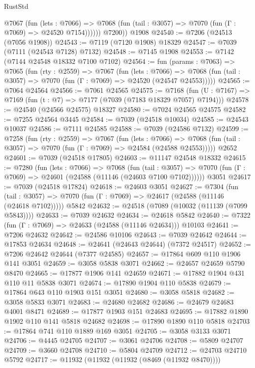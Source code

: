 \begin{lexlean}{RustStd}
\begin{coremodule}
            @7067
              (fun (lets : @7066) =>
              @7068 (fun (tail : @3057) => @7070 (fun (Γ : @7069) => @24520 @7154))))))
        @7200))
    @1908
@24540 := @7206 (@24513 (@7056 @1908))
@24543 := @7119 (@7120 @1908) @18329
@24547 := @7039 (@7111 (@24543 @7128) @7132)
@24548 := @7145 @1908
@24553 := @7142 (@7144 @24548 @18332 @7100 @7102)
@24564 := fun (params : @7063) =>
  @7065
    (fun (rty : @2559) =>
    @7067
      (fun (lets : @7066) =>
      @7068 (fun (tail : @3057) => @7070 (fun (Γ : @7069) => @24520 (@24547 @24553)))))
@24565 := @7064 @24564
@24566 := @7061 @24565
@24575 := @7168
    (fun (U : @7167) => @7169 (fun (t : @7) => @7177 (@7039 (@7183 @18329 @7057) @7194)))
@24578 := @24540 (@24566 @24575) @18327
@24580 := @7024 @24565 @24575
@24582 := @7255 @24564 @3445
@24584 := @7039 (@24518 @10034)
@24585 := @24543 @10037
@24586 := @7111 @24585
@24588 := @7039 (@24586 @7132)
@24599 := @7258
    (fun (rty : @2559) =>
    @7067
      (fun (lets : @7066) =>
      @7068 (fun (tail : @3057) => @7070 (fun (Γ : @7069) => @24584 (@24588 @24553)))))
    @2652
@24601 := @7039 (@24518 @17805)
@24603 := @11147 @24548 @18332
@24615 := @7280
    (fun (lets : @7066) =>
    @7068
      (fun (tail : @3057) =>
      @7070 (fun (Γ : @7069) => @24601 (@24588 (@11146 (@24603 @7100 @7102))))))
    @3051
@24617 := @7039 (@24518 @17824)
@24618 := @24603 @3051
@24627 := @7304
    (fun (tail : @3057) => @7070 (fun (Γ : @7069) => @24617 (@24588 (@11146 (@24618 @7102)))))
    @5842
@24632 := @24518 (@7089 (@10032 (@11139 (@7099 @5843))))
@24633 := @7039 @24632
@24634 := @24618 @5842
@24640 := @7322 (fun (Γ : @7069) => @24633 (@24588 (@11146 @24634))) @10103
@24641 := @7206 @24632
@24642 := @24586 @10106
@24643 := @7039 @24642
@24644 := @17853 @24634
@24648 := @24641 (@24643 @24644) (@7372 @24517)
@24652 := @7206 @24642 @24644 (@7377 @24585)
@24657 := @17864 @609 @110 @1906 @141 @3051
@24659 := @3058 @5838 @3071
@24662 := @24657 @24659 @5790 @8470
@24665 := @17877 @1906 @141 @24659
@24671 := @17882 @1904 @431 @110 @11 @5838 @3071
@24674 := @17890 @1904 @110 @5838
@24679 := @17864 @643 @110 @1903 @151 @3051
@24680 := @3058 @5818
@24682 := @3058 @5833 @3071
@24683 := @24680 @24682
@24686 := @24679 @24683 @4001 @8471
@24689 := @17877 @1903 @151 @24683
@24695 := @17882 @1890 @1902 @110 @141 @5818 @24682
@24698 := @17890 @1890 @110 @5818
@24703 := @17864 @741 @110 @1889 @169 @3051
@24705 := @3058 @3133 @3071
@24706 := @4445 @24705
@24707 := @3061 @24706
@24708 := @5809 @24707
@24709 := @3660 @24708
@24710 := @5804 @24709
@24712 := @24703 @24710 @5792
@24717 := @11932 (@11932 (@11932 (@8469 (@11932 @8470))))

\end{coremodule}
\end{lexlean}
